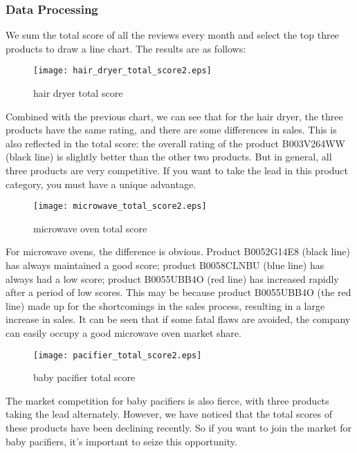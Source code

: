 \documentclass{mcmthesis}
\begin{document}
	\subsubsection{Data Processing}
	We sum the total score of all the reviews every month and select the top three products to draw a line chart. The results are as follows:
	
	\begin{figure}[H]
		\small
		\centering
		\texttt{[image: hair\_dryer\_total\_score2.eps]}
		\caption{hair dryer total score} \label{fig:hair dryer total score}
	\end{figure}
	
	Combined with the previous chart, we can see that for the hair dryer, the three products have the same rating, and there are some differences in sales. This is also reflected in the total score: the overall rating of the product B003V264WW (black line) is slightly better than the other two products. But in general, all three products are very competitive. If you want to take the lead in this product category, you must have a unique advantage.
	
	\begin{figure}[H]
		\small
		\centering
		\texttt{[image: microwave\_total\_score2.eps]}
		\caption{microwave oven total score} \label{fig:microwave total score}
	\end{figure}
	
	For microwave ovens, the difference is obvious. Product B0052G14E8 (black line) has always maintained a good score; product B0058CLNBU (blue line) has always had a low score; product B0055UBB4O (red line) has increased rapidly after a period of low scores. This may be because product B0055UBB4O (the red line) made up for the shortcomings in the sales process, resulting in a large increase in sales. It can be seen that if some fatal flaws are avoided, the company can easily occupy a good microwave oven market share.
	
	\begin{figure}[H]
		\small
		\centering
		\texttt{[image: pacifier\_total\_score2.eps]}
		\caption{baby pacifier total score} \label{fig:pacifier total score}
	\end{figure}
	
	The market competition for baby pacifiers is also fierce, with three products taking the lead alternately. However, we have noticed that the total scores of these products have been declining recently. So if you want to join the market for baby pacifiers, it's important to seize this opportunity.
	
\end{document}
